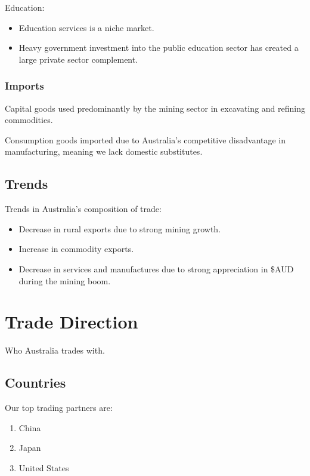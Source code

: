 \documentclass[a4paper,11pt]{report}
\begin{document}
Education:

\begin{itemize}
\item Education services is a niche market.
\item Heavy government investment into the public education sector has created
 	a large private sector complement.
\end{itemize}

\subsubsection{Imports}

Capital goods used predominantly by the mining sector in excavating and
refining commodities.

Consumption goods imported due to Australia's competitive disadvantage in
manufacturing, meaning we lack domestic substitutes.

\subsection{Trends}

Trends in Australia's composition of trade:

\begin{itemize}
\item Decrease in rural exports due to strong mining growth.
\item Increase in commodity exports.
\item Decrease in services and manufactures due to strong appreciation in \$AUD
	during the mining boom.
\end{itemize}


\section{Trade Direction}

Who Australia trades with.

\subsection{Countries}

Our top trading partners are:

\begin{enumerate}
\item China
\item Japan
\item United States
\end{enumerate}
\end{document}
